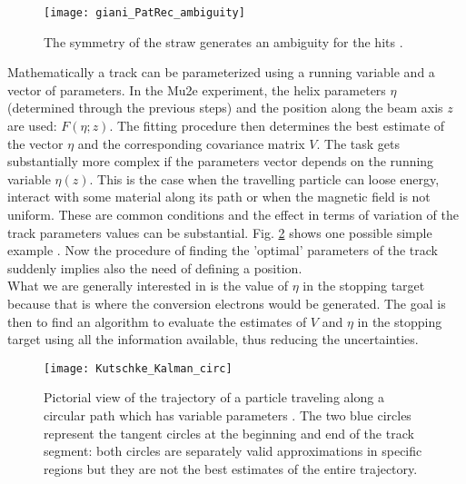 \documentclass[12pt,a4paper,openright, oneside, titlepage]{book} %
\begin{document}
\begin{figure}[h!]
\centering
\texttt{[image: giani\_PatRec\_ambiguity]}
\caption{The symmetry of the straw generates an ambiguity for the hits \cite{GianiPatRec:2020}.}
\label{_ambiguity}
\end{figure}

\noindent Mathematically a track can be parameterized using a running variable and a vector of parameters. 
In the Mu2e experiment, the helix parameters $\eta$ (determined through the previous steps) 
and the position along the beam axis $z$ are used: $F(\eta;z)$. 
The fitting procedure then determines the best estimate of the vector $\eta$ and the corresponding covariance matrix $V$. 
The task gets substantially more complex if the parameters vector depends on the running variable $\eta(z)$. 
This is the case when the travelling particle can loose energy, interact with some material along its path or when the magnetic field is not uniform. 
These are common conditions and the effect in terms of variation of the track parameters values
can be substantial.
Fig. \ref{_Kutschke_Kalman_circ} shows one possible simple example \cite{Kutschke}.
Now the procedure of finding the 'optimal' parameters of the track suddenly implies also the need of defining a position.\\
What we are generally interested in is the value of $\eta$ in the stopping target because that is where the conversion electrons would be generated. The goal is then to find an algorithm to evaluate the estimates of $V$ and $\eta$ in the stopping target using all the information available, thus reducing the uncertainties.\\

\begin{figure}[h!]
\centering
\texttt{[image: Kutschke\_Kalman\_circ]}
\caption{Pictorial view of the trajectory of a particle traveling along a circular path which has variable parameters \cite{Kutschke}. 
The two blue circles represent the tangent circles at the beginning and end of the track segment: 
both circles are separately valid approximations in specific regions 
but they are not the best estimates of the entire trajectory.}
\label{_Kutschke_Kalman_circ}
\end{figure}
\end{document}
